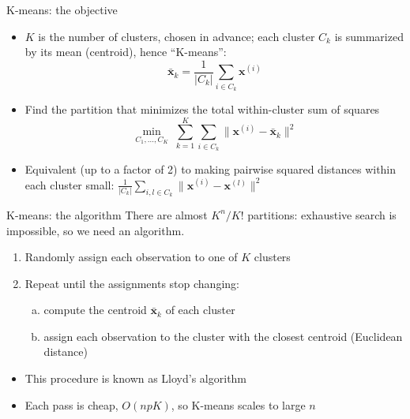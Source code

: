 \begin{frame}{K-means: the objective}
    \begin{itemize}
        \item $K$ is the number of clusters, chosen in advance; each cluster $C_k$ is summarized by its mean (centroid), hence ``K-means'':
        \[
            \bar{\mathbf{x}}_k = \frac{1}{|C_k|} \sum_{i \in C_k} \mathbf{x}^{(i)}
        \]
        \item Find the partition that minimizes the total within-cluster sum of squares
        \[
            \min_{C_1, \dots, C_K} \; \sum_{k=1}^{K} \sum_{i \in C_k} \bigl\lVert \mathbf{x}^{(i)} - \bar{\mathbf{x}}_k \bigr\rVert^2
        \]
        \item Equivalent (up to a factor of 2) to making pairwise squared distances within each cluster small: $\frac{1}{|C_k|} \sum_{i, l \in C_k} \lVert \mathbf{x}^{(i)} - \mathbf{x}^{(l)} \rVert^2$
    \end{itemize}
\end{frame}

\begin{frame}{K-means: the algorithm}
    There are almost $K^n / K!$ partitions: exhaustive search is impossible, so we need an algorithm.
    \begin{enumerate}
        \item Randomly assign each observation to one of $K$ clusters
        \item Repeat until the assignments stop changing:
            \begin{enumerate}[(a)]
                \item compute the centroid $\bar{\mathbf{x}}_k$ of each cluster
                \item assign each observation to the cluster with the closest centroid (Euclidean distance)
            \end{enumerate}
    \end{enumerate}
    \svspace{1em}
    \begin{itemize}
        \item This procedure is known as Lloyd's algorithm
        \item Each pass is cheap, $O(npK)$, so K-means scales to large $n$
    \end{itemize}
\end{frame}

